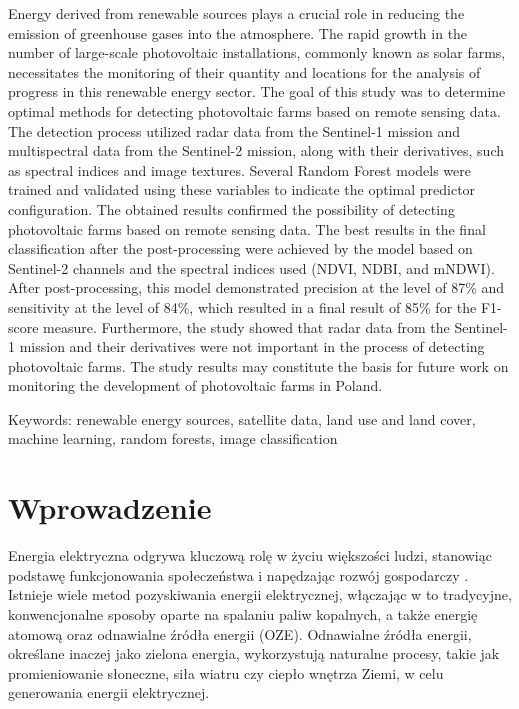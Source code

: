 \documentclass{amuthesis}
\begin{document}
Energy derived from renewable sources plays a crucial role in reducing
the emission of greenhouse gases into the atmosphere. The rapid growth
in the number of large-scale photovoltaic installations, commonly known
as solar farms, necessitates the monitoring of their quantity and
locations for the analysis of progress in this renewable energy sector.
The goal of this study was to determine optimal methods for detecting
photovoltaic farms based on remote sensing data. The detection process
utilized radar data from the Sentinel-1 mission and multispectral data
from the Sentinel-2 mission, along with their derivatives, such as
spectral indices and image textures. Several Random Forest models were
trained and validated using these variables to indicate the optimal
predictor configuration. The obtained results confirmed the possibility
of detecting photovoltaic farms based on remote sensing data. The best
results in the final classification after the post-processing were
achieved by the model based on Sentinel-2 channels and the spectral
indices used (NDVI, NDBI, and mNDWI). After post-processing, this model
demonstrated precision at the level of 87\% and sensitivity at the level
of 84\%, which resulted in a final result of 85\% for the F1-score
measure. Furthermore, the study showed that radar data from the
Sentinel-1 mission and their derivatives were not important in the
process of detecting photovoltaic farms. The study results may
constitute the basis for future work on monitoring the development of
photovoltaic farms in Poland.

Keywords: renewable energy sources, satellite data, land use and land
cover, machine learning, random forests, image classification

\newpage

\sf\tighttoc\doublespacing


\hypertarget{sec-wprowadzenie}{%
\chapter{Wprowadzenie}\label{sec-wprowadzenie}}

Energia elektryczna odgrywa kluczową rolę w życiu większości ludzi,
stanowiąc podstawę funkcjonowania społeczeństwa i napędzając rozwój
gospodarczy \autocite{iea2021}. Istnieje wiele metod pozyskiwania
energii elektrycznej, włączając w to tradycyjne, konwencjonalne sposoby
oparte na spalaniu paliw kopalnych, a także energię atomową oraz
odnawialne źródła energii (OZE). Odnawialne źródła energii, określane
inaczej jako zielona energia, wykorzystują naturalne procesy, takie jak
promieniowanie słoneczne, siła wiatru czy ciepło wnętrza Ziemi, w celu
generowania energii elektrycznej.
\end{document}
